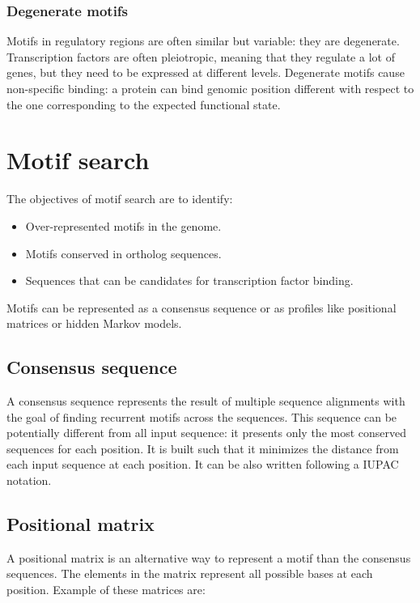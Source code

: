 	\subsubsection{Degenerate motifs}
	Motifs in regulatory regions are often similar but variable: they are degenerate.
	Transcription factors are often pleiotropic, meaning that they regulate a lot of genes, but they need to be expressed at different levels.
	Degenerate motifs cause non-specific binding: a protein can bind genomic position different with respect to the one corresponding to the expected functional state.

\section{Motif search}
The objectives of motif search are to identify:

\begin{multicols}{3}
	\begin{itemize}
		\item Over-represented motifs in the genome.
		\item Motifs conserved in ortholog sequences.
		\item Sequences that can be candidates for transcription factor binding.
	\end{itemize}
\end{multicols}

Motifs can be represented as a consensus sequence or as profiles like positional matrices or hidden Markov models.

	\subsection{Consensus sequence}
	A consensus sequence represents the result of multiple sequence alignments with the goal of finding recurrent motifs across the sequences.
	This sequence can be potentially different from all input sequence: it presents only the most conserved sequences for each position.
	It is built such that it minimizes the distance from each input sequence at each position.
	It can be also written following a IUPAC notation.

	\subsection{Positional matrix}
	A positional matrix is an alternative way to represent a motif than the consensus sequences.
	The elements in the matrix represent all possible bases at each position.
	Example of these matrices are:

